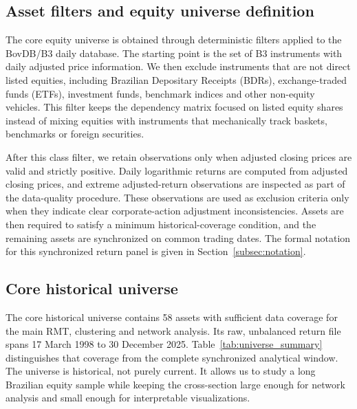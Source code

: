 \subsection{Asset filters and equity universe definition}

The core equity universe is obtained through deterministic filters applied to the BovDB/B3 daily database. The starting point is the set of B3 instruments with daily adjusted price information. We then exclude instruments that are not direct listed equities, including Brazilian Depositary Receipts (BDRs), exchange-traded funds (ETFs), investment funds, benchmark indices and other non-equity vehicles. This filter keeps the dependency matrix focused on listed equity shares instead of mixing equities with instruments that mechanically track baskets, benchmarks or foreign securities.

After this class filter, we retain observations only when adjusted closing prices are valid and strictly positive. Daily logarithmic returns are computed from adjusted closing prices, and extreme adjusted-return observations are inspected as part of the data-quality procedure. These observations are used as exclusion criteria only when they indicate clear corporate-action adjustment inconsistencies. Assets are then required to satisfy a minimum historical-coverage condition, and the remaining assets are synchronized on common trading dates. The formal notation for this synchronized return panel is given in Section~\ref{subsec:notation}.

\subsection{Core historical universe}

The core historical universe contains 58 assets with sufficient data coverage for the main RMT, clustering and network analysis. Its raw, unbalanced return file spans 17 March 1998 to 30 December 2025. Table~\ref{tab:universe_summary} distinguishes that coverage from the complete synchronized analytical window. The universe is historical, not purely current. It allows us to study a long Brazilian equity sample while keeping the cross-section large enough for network analysis and small enough for interpretable visualizations.

\begin{center}
\label{tab:universe_summary}
\end{center}
\GlobalPrecisionNote

